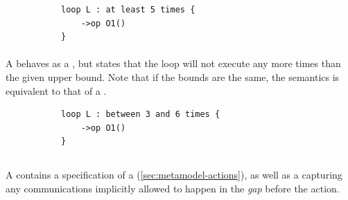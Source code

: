 \begin{figure}[h!]
\begin{subfigure}[t]{\egtextwidth}
\begin{lstlisting}[style=Example]
loop L : at least 5 times {
    ->op O1()
}
\end{lstlisting}
\end{subfigure}
\hfill
\begin{subfigure}[t]{\eggraphicalwidth}
  \gsecaption
  \centering
\end{subfigure}
\end{figure}

\paragraph{\mrangeloopbound}
A \mrangeloopbound{} behaves as a \mlowerloopbound, but states that
the loop will not execute any more times than the given upper bound.
Note that if the bounds are the same, the semantics is equivalent
to that of a \mdefiniteloopbound{}.

\begin{figure}[H]
\begin{subfigure}[t]{\egtextwidth}
\begin{lstlisting}[style=Example]
loop L : between 3 and 6 times {
    ->op O1()
}
\end{lstlisting}
\end{subfigure}
\hfill
\begin{subfigure}[t]{\eggraphicalwidth}
  \gsecaption
  \centering
\end{subfigure}
\end{figure}

\subsection{\mactionstep}\label{ssec:metamodel-steps-actions}

A \mactionstep{} contains a specification of a
\msequenceaction{} (\cref{sec:metamodel-actions}), as well as
a \mmessageset{}
capturing any communications implicitly allowed to happen
in the \emph{gap} before the action.

